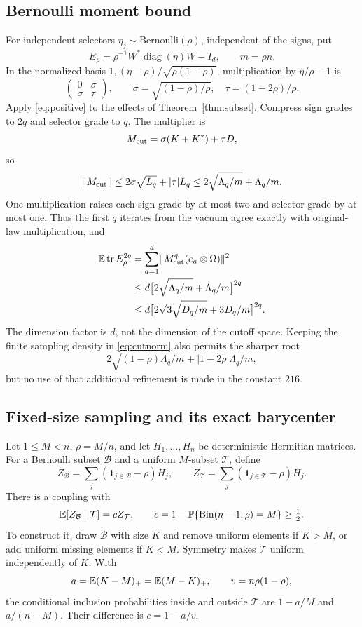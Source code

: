 \documentclass[11pt]{article}
\numberwithin{equation}{section}
\theoremstyle{definition}\newtheorem{definition}[theorem]{Definition}
\theoremstyle{remark}\newtheorem{remark}[theorem]{Remark}
\newcommand{\tr}{\operatorname{tr}}\newcommand{\Ent}{\operatorname{Ent}}
\newcommand{\norm}[1]{\lVert#1\rVert}\newcommand{\ip}[2]{\langle#1,#2\rangle}
\newcommand{\one}{\mathbf1}\newcommand{\F}{\mathbb F}
\newcommand{\diag}{\operatorname{diag}}
\begin{document}
\subsection{Bernoulli moment bound}
For independent selectors $\eta_j\sim\mathrm{Bernoulli}(\rho)$, independent of the signs, put
\[
 E_\rho=\rho^{-1}W^*\diag(\eta)W-I_d,\qquad m=\rho n.
\]
In the normalized basis $1,(\eta-\rho)/\sqrt{\rho(1-\rho)}$, multiplication by $\eta/\rho-1$ is
\[
 \begin{pmatrix}0&\sigma\\\sigma&\tau\end{pmatrix},\qquad
 \sigma=\sqrt{(1-\rho)/\rho},\quad \tau=(1-2\rho)/\rho.
\]
Apply \eqref{eq:positive} to the effects of Theorem~\ref{thm:subset}. Compress sign grades to $2q$ and selector grade to $q$. The multiplier is
\[
 M_{\rm cut}=\sigma(K+K^*)+\tau D,
\]
so
\begin{equation}
 \norm{M_{\rm cut}}\le2\sigma\sqrt{L_q}+|\tau|L_q
      \le2\sqrt{\Lambda_q/m}+\Lambda_q/m.
 \label{eq:cutnorm}
\end{equation}
One multiplication raises each sign grade by at most two and selector grade by at most one. Thus the first $q$ iterates from the vacuum agree exactly with original-law multiplication, and
\begin{align}
 \E\tr E_\rho^{2q}
 &=\sum_{a=1}^d\norm{M_{\rm cut}^q(e_a\otimes\Omega)}^2\nonumber\\
 &\le d\big[2\sqrt{\Lambda_q/m}+\Lambda_q/m\big]^{2q}\nonumber\\
 &\le d\big[2\sqrt3\sqrt{D_q/m}+3D_q/m\big]^{2q}.
 \label{eq:Bernoulli}
\end{align}
The dimension factor is $d$, not the dimension of the cutoff space. Keeping the finite sampling density in \eqref{eq:cutnorm} also permits the sharper root
\[
 2\sqrt{(1-\rho)\Lambda_q/m}+|1-2\rho|\Lambda_q/m,
\]
but no use of that additional refinement is made in the constant $216$.

\subsection{Fixed-size sampling and its exact barycenter}
\label{subsec:sampling}
Let $1\le M<n$, $\rho=M/n$, and let $H_1,\ldots,H_n$ be deterministic Hermitian matrices. For a Bernoulli subset $\mathcal B$ and a uniform $M$-subset $\mathcal T$, define
\[
 Z_{\mathcal B}=\sum_j(\one_{j\in\mathcal B}-\rho)H_j,
 \qquad Z_{\mathcal T}=\sum_j(\one_{j\in\mathcal T}-\rho)H_j.
\]
There is a coupling with
\begin{equation}
 \mathbb E[Z_{\mathcal B}\mid\mathcal T]=cZ_{\mathcal T},\qquad
 c=1-\mathbb P\{\mathrm{Bin}(n-1,\rho)=M\}\ge\tfrac12.
 \label{eq:barycenter}
\end{equation}
To construct it, draw $\mathcal B$ with size $K$ and remove uniform elements if $K>M$, or add uniform missing elements if $K<M$. Symmetry makes $\mathcal T$ uniform independently of $K$. With
\[
 a=\mathbb E(K-M)_+=\mathbb E(M-K)_+,\qquad v=n\rho(1-\rho),
\]
the conditional inclusion probabilities inside and outside $\mathcal T$ are $1-a/M$ and $a/(n-M)$. Their difference is $c=1-a/v$.
\end{document}
